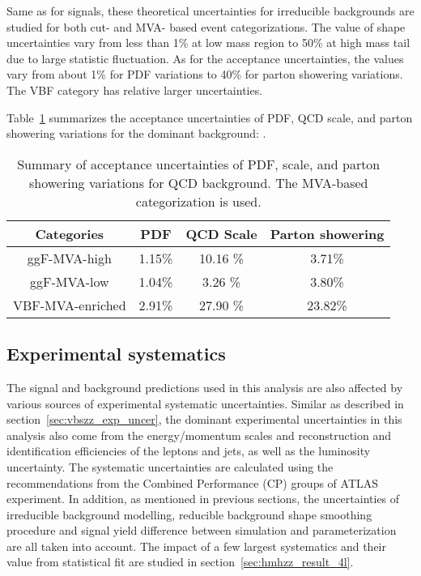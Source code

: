 Same as for signals, these theoretical uncertainties for irreducible backgrounds are studied for both cut- and MVA- based event categorizations.
The value of shape uncertainties vary from less than 1\% at low mass region to 50\% at high mass tail due to large statistic fluctuation.
As for the acceptance uncertainties, the values vary from about 1\% for PDF variations to 40\% for parton showering variations.
The VBF category has relative larger uncertainties.

Table~\ref{tab:acc-all-qqZZ_MVA} summarizes the acceptance uncertainties of PDF, QCD scale, and parton showering variations for the dominant background: \qqZZ.

\begin{table}[htbp]
  \centering
  \caption{Summary of acceptance uncertainties of PDF, scale, and parton showering variations for QCD \qqZZ background. The MVA-based categorization is used.}
  \label{tab:acc-all-qqZZ_MVA}
  \begin{spacing}{0.75}
  \begin{tabular}{cccc}
    \toprule
    Categories  & PDF    & QCD Scale   & Parton showering \\
    \midrule
    ggF-MVA-high  & 1.15\% & 10.16 \% & 3.71\% \\
    ggF-MVA-low   & 1.04\% & 3.26  \% & 3.80\% \\
    VBF-MVA-enriched  & 2.91\% & 27.90 \% & 23.82\% \\
    \bottomrule
  \end{tabular}
  \end{spacing}
\end{table}

\subsection{Experimental systematics}

The signal and background predictions used in this analysis are also affected by various sources of experimental systematic uncertainties.
Similar as described in section~\ref{sec:vbszz_exp_uncer}, the dominant experimental uncertainties in this analysis also come from the energy/momentum scales 
and reconstruction and identification efficiencies of the leptons and jets, as well as the luminosity uncertainty.
The systematic uncertainties are calculated using the recommendations from the Combined Performance (CP) groups of ATLAS experiment.
In addition, as mentioned in previous sections, the uncertainties of irreducible background modelling, reducible background shape smoothing procedure and signal yield difference between simulation and parameterization are all taken into account.
The impact of a few largest systematics and their value from statistical fit are studied in section~\ref{sec:hmhzz_result_4l}.


